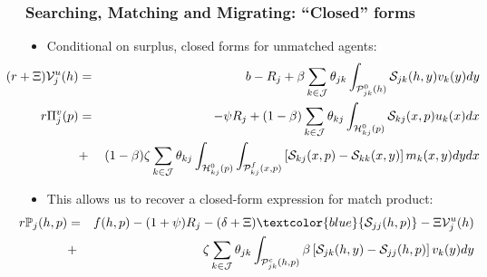 \documentclass{beamer}
\newcommand{\1}{\mathbb{1}}
\newcommand{\J}{\mathcal{J}}
\newcommand{\sumktot}{\sum_{\substack{k \in \J}}}
\newcommand{\V}{\mathcal{V}}
\newcommand{\Su}{\mathcal{S}}
\begin{document}
\begin{frame}\frametitle{Searching, Matching and Migrating: ``Closed'' forms}

\begin{itemize}
\item Conditional on surplus, closed forms for unmatched agents:
\small
\begin{eqnarray*}
\hspace{-1.2cm}(r+\Xi) \V^u_j(h) 
 &=&b-R_j +\beta\sumktot  \theta_{jk} \int_{\mathcal{P}^0_{jk}(h)}  \Su_{jk}(h,y) v_k(y)dy\\
\hspace{-1.2cm} r \Pi^v_j(p) 
&=& -\psi R_j+(1-\beta) \sumktot \theta_{kj}
\int_{\mathcal{H}^0_{kj}(p)}   \Su_{kj}(x,p) u_k(x)dx\\
&+&(1-\beta) \zeta\sumktot \theta_{kj}\int_{\mathcal{H}^0_{kj}(p)}\int_{\mathcal{P}^f_{kj}(x,p)} \left[ \Su_{kj}(x, p)- \Su_{kk}(x,y) \right] m_k(x,y)dydx\notag
 \end{eqnarray*}\normalsize

\item This allows us to recover a closed-form expression for match product:\small
\begin{eqnarray*}
\hspace{-1cm}r\mathbb{P}_j(h,p)&=& f(h,p)-(1+\psi)R_j -(\delta+\Xi) \textcolor{blue}{\Su_{jj}(h,p)}-\Xi\V^u_j(h)\\\notag
&+& \zeta\sumktot \theta_{jk}
\int_{\mathcal{P}^c_{jk}(h,p)}\beta\left[\Su_{jk}(h, y)-\Su_{jj}(h,p)\right] v_k(y)dy
\end{eqnarray*}
\end{itemize}
\end{frame}
\end{document}
